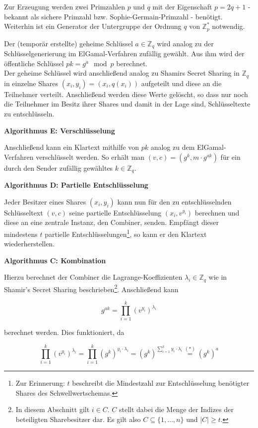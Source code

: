 Zur Erzeugung werden zwei Primzahlen \(p\) und \(q\) mit der Eigenschaft \(p = 2q + 1\) - bekannt als sichere Primzahl bzw. Sophie-Germain-Primzahl - benötigt. Weiterhin ist ein Generator der Untergruppe der Ordnung \(q\) von \(\mathbb{Z}_p^*\) notwendig.

Der (temporär erstellte) geheime Schlüssel \(a \in \mathbb{Z}_q\) wird analog zu der Schlüsselgenerierung im ElGamal-Verfahren zufällig gewählt. Aus ihm wird der öffentliche Schlüssel \(pk = g^a \mod p\) berechnet.\\
Der geheime Schlüssel wird anschließend analog zu Shamirs Secret Sharing in \(\mathbb{Z}_q\) in einzelne Shares \((x_i, y_i) = (x_i, q(x_i))\) aufgeteilt und diese an die Teilnehmer verteilt. Anschließend werden diese Werte gelöscht, so dass nur noch die Teilnehmer im Besitz ihrer Shares und damit in der Lage sind, Schlüsseltexte zu entschlüsseln.

\textbf{Algorithmus E: Verschlüsselung}

Anschließend kann ein Klartext mithilfe von \(pk\) analog zu dem ElGamal-Verfahren 
verschlüsselt werden. So erhält man \((v,c) = (g^k, m \cdot g^{ak})\) für ein durch den Sender zufällig gewähltes \(k \in \mathbb{Z}_q\).

\textbf{Algorithmus D: Partielle Entschlüsselung}

Jeder Besitzer eines Shares \((x_i, y_i)\) kann nun für den zu entschlüsselnden Schlüsseltext \((v,c)\) seine partielle Entschlüsselung \((x_i, v^{y_i})\) berechnen und diese an eine zentrale Instanz, den Combiner, senden. Empfängt dieser mindestens \(t\) partielle Entschlüsselungen\footnote{
  Zur Erinnerung: \(t\) beschreibt die Mindestzahl zur Entschlüsselung benötigter Shares des Schwellwertschemas.
}, so kann er den Klartext wiederherstellen.

\textbf{Algorithmus C: Kombination}

Hierzu berechnet der Combiner die Lagrange-Koeffizienten \(\lambda_i \in \mathbb{Z}_q\) wie in Shamir's Secret Sharing beschrieben\footnote{
  In diesem Abschnitt gilt \(i \in C\). \(C\) stellt dabei die Menge der Indizes der beteiligten Sharebesitzer dar. Es gilt also \(C \subseteq \{1, \dots, n\}\) und \(| C | \ge t\).
}. Anschließend kann
 
\[g^{ak} = \prod_{i=1}^k (v^{y_i})^{\lambda_i}\]

berechnet werden. Dies funktioniert, da 

\[
\prod_{i=1}^k (v^{y_i})^{\lambda_i} = 
\prod_{i=1}^k (g^k)^{y_i \cdot \lambda_i} = 
(g^k)^{\sum_{i=1}^{k} y_i \cdot \lambda_i} \overset{(*)}{=}
(g^k)^a
\]

